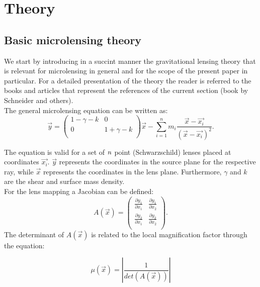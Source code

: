 
\section{Theory}

\subsection{Basic microlensing theory}

We start by introducing in a succint manner the gravitational lensing theory that is relevant for microlensing in general and for the scope of the
present paper in particular. For a detailed presentation of the theory the reader is referred to the books and articles that represent the references
of the current section (book by Schneider and others).\\

The general microlensing equation can be written as:
\begin{equation}
\vec{y} =   
 \begin{pmatrix}
  1-\gamma - k & 0 \\
  0 & 1 + \gamma -k \\
 \end{pmatrix} 
\vec{x} - \sum_{i=1}^{n} m_i \frac{\vec{x} - \vec{x_i}}{\left( \vec{x} - \vec{x_i} \right)^2}.
\end{equation} 

The equation is valid for a set of $\it{n}$ point (Schwarzschild) lenses placed at coordinates $\vec{x_i}$. $\vec{y}$ represents the coordinates in the source plane for the respective ray, while 
$\vec{x}$ represents the coordinates in the lens plane. Furthermore, $\gamma$ and $k$ are the shear and surface mass density.\\

For the lens mapping a Jacobian can be defined:
\begin{equation} 
A(\vec{x}) = 
 \begin{pmatrix}
  \frac{\partial{y_1}}{\partial{x_1}} & \frac{\partial{y_1}}{\partial{x_2}} \\
  \frac{\partial{y_2}}{\partial{x_1}} & \frac{\partial{y_2}}{\partial{x_2}} \\
 \end{pmatrix}. 
\end{equation}
The determinant of $A(\vec{x})$ is related to the local magnification factor through the equation:

\begin{equation}
\mu(\vec{x}) = \left| \frac{1}{det(A(\vec{x}))} \right|
\end{equation}

